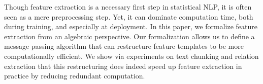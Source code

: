 Though feature extraction is a necessary first step in statistical NLP, it is often seen as a mere preprocessing step. Yet, it can dominate computation time, both during training, and especially at deployment. In this paper, we formalize feature extraction from an algebraic perspective. Our formalization allows us to define a message passing algorithm that can restructure feature templates to be more computationally efficient. We show via experiments on text chunking and relation extraction that this restructuring does indeed speed up feature extraction in practice by reducing redundant computation.
